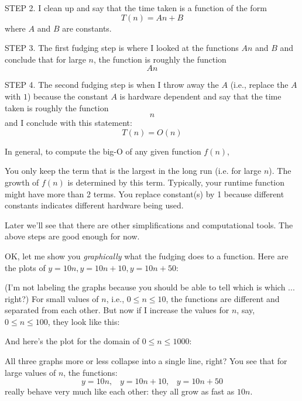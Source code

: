 STEP 2. I clean up and say 
that the time taken is a function of the form
\[
T(n) = An + B
\] 
where $A$ and $B$ are constants.

STEP 3.
The first fudging step is where I looked at the functions $An$ and $B$
and conclude that for large $n$, the function is roughly the function
\[
An
\]

STEP 4.
The second fudging step is when I throw away the $A$ (i.e., replace
the $A$ with $1$) because
the constant $A$ is hardware dependent and say that the 
time taken is roughly the function
\[
n
\]
and I conclude with this statement:
\[
T(n) = O(n)
\]

In general, to compute the big-O of any given function $f(n)$,
\begin{itemize}
\li You only keep the term that is the largest in the long run 
(i.e. for large $n$).
The growth of $f(n)$ is determined by this term.
Typically, your runtime function might have more than 2 terms.
\li You replace constant(s) by 1 because different constants
indicates different hardware being used.
\end{itemize}
Later we'll see that there are other simplifications and computational
tools.
The above steps are good enough for now.

OK, let me show you \textit{graphically} what the fudging does to a function.
Here are the plots of $y = 10n, y = 10n + 10, y = 10n + 50$:


(I'm not labeling the graphs
because you should be able to tell which is which ... right?)
For small values of $n$, i.e., $0 \leq n \leq 10$, the functions
are different and separated from each other.
But now if I increase the values for $n$, say, $0 \leq n \leq 100$, 
they look like this:


And here's the plot for the domain of $0 \leq n \leq 1000$:

All three graphs more or less collapse into a single line, right?
You see that for large values of $n$,
the functions:
\[
y = 10n, \,\,\,\,\,
y = 10n + 10, \,\,\,\,\, 
y = 10n + 50
\]
really behave very much like each other: they all grow as fast as $10n$.


